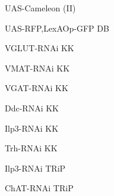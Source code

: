 \documentclass[17pt]{extarticle}
\begin{document}
\footnotesize
\newpage\vspace*{-0.15cm}
\begin{footnotesize}
UAS-Cameleon (II) \\[0.5em]
\end{footnotesize}
\footnotesize
\newpage\vspace*{-0.15cm}
\begin{footnotesize}
UAS-RFP,LexAOp-GFP DB \\[0.5em]
\end{footnotesize}
\footnotesize
\newpage\vspace*{-0.15cm}
\begin{normalsize}
VGLUT-RNAi KK \\[0.5em]
\end{normalsize}
\footnotesize
\newpage\vspace*{-0.15cm}
\begin{normalsize}
VMAT-RNAi KK \\[0.5em]
\end{normalsize}
\footnotesize
\newpage\vspace*{-0.15cm}
\begin{normalsize}
VGAT-RNAi KK \\[0.5em]
\end{normalsize}
\footnotesize
\newpage\vspace*{-0.15cm}
\begin{normalsize}
Ddc-RNAi KK \\[0.5em]
\end{normalsize}
\footnotesize
\newpage\vspace*{-0.15cm}
\begin{normalsize}
Ilp3-RNAi KK \\[0.5em]
\end{normalsize}
\footnotesize
\newpage\vspace*{-0.15cm}
\begin{normalsize}
Trh-RNAi KK \\[0.5em]
\end{normalsize}
\footnotesize
\newpage\vspace*{-0.15cm}
\begin{normalsize}
Ilp3-RNAi TRiP \\[0.5em]
\end{normalsize}
\footnotesize
\newpage\vspace*{-0.15cm}
\begin{normalsize}
ChAT-RNAi TRiP \\[0.5em]
\end{normalsize}
\end{document}

